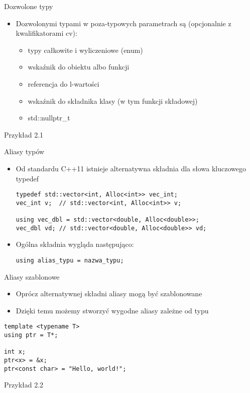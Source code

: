 \documentclass[11pt]{beamer}
\begin{document}
\begin{frame}[fragile]{Dozwolone typy}
    \begin{itemize}
        \item Dozwolonymi typami w poza-typowych parametrach są (opcjonalnie z kwalifikatorami cv):
        \begin{itemize}
            \item typy całkowite i wyliczeniowe (enum)
            \item wskaźnik do obiektu albo funkcji
            \item referencja do l-wartości
            \item wskaźnik do składnika klasy (w tym funkcji składowej)
            \item std::nullptr\_t
        \end{itemize}
    \end{itemize}
    \alert{Przykład 2.1}
\end{frame}

\begin{frame}[fragile]{Aliasy typów}
    \begin{itemize}
        \item Od standardu C++11 istnieje alternatywna składnia dla słowa kluczowego typedef
    \begin{lstlisting}[frame=single]
typedef std::vector<int, Alloc<int>> vec_int;
vec_int v;  // std::vector<int, Alloc<int>> v;

using vec_dbl = std::vector<double, Alloc<double>>;
vec_dbl vd; // std::vector<double, Alloc<double>> vd;
    \end{lstlisting}
        \item Ogólna składnia wygląda następująco:
\begin{lstlisting}[frame=single]
using alias_typu = nazwa_typu;
    \end{lstlisting}
    
    \end{itemize}
\end{frame}

\begin{frame}[fragile]{Aliasy szablonowe}
    \begin{itemize}
        \item Oprócz alternatywnej składni aliasy mogą być szablonowane
        \item Dzięki temu możemy stworzyć wygodne aliasy zależne od typu
    \end{itemize}
    \begin{lstlisting}[frame=single]
template <typename T>
using ptr = T*;

int x;
ptr<x> = &x;
ptr<const char> = "Hello, world!";
    \end{lstlisting}
    \alert{Przykład 2.2}
\end{frame}
\end{document}
